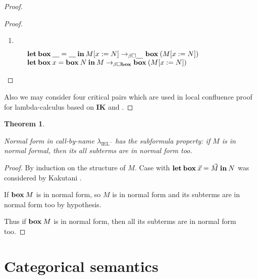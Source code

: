 \documentclass[a4paper]{article}
\newtheorem{theorem}{Theorem}
\begin{document}
\begin{proof}
\begin{proof}
\begin{enumerate}
\item $ $ \\


$\begin{array}{lll}
&{\bf let \: box \:} \underline{\quad} = \underline{\quad} {\: \bf in \:} M [x := N] \rightarrow_{\beta \Box \underline{\quad}} {\bf box \:} (M [x := N])& \\
&{\bf let \: box \:} x = {\bf box \:} N {\: \bf in \:} M \rightarrow_{\beta \Box {\bf box}} {\bf box \:} (M [x := N])&
\end{array}$
\end{enumerate}
\end{proof}

Also we may consider four critical pairs which are used in local confluence proof for lambda-calculus based on {\bf IK} and \cite{ModalK}.

\end{proof}

\begin{theorem}
  $ $

  Normal form in call-by-name $\lambda_{\text{IEL}^{-}}$ has the subformula property: if $M$ is in normal formal, then its all subterms are in normal form too.

\end{theorem}

\begin{proof}
  By induction on the structure of $M$.
  Case with ${\bf let \: box \:} \vec{x} = \vec{M} {\: \bf in \:} N$ was considered by Kakutani \cite{ModalK} \cite{ModalK1}.

  If ${\bf box \:} M$ is in normal form, so $M$ is in normal form and its subterms are in normal form too by hypothesis.

  Thus if ${\bf box \:} M$ is in normal form, then all its subterms are in normal form too.
\end{proof}

\section{Categorical semantics}
\end{document}
